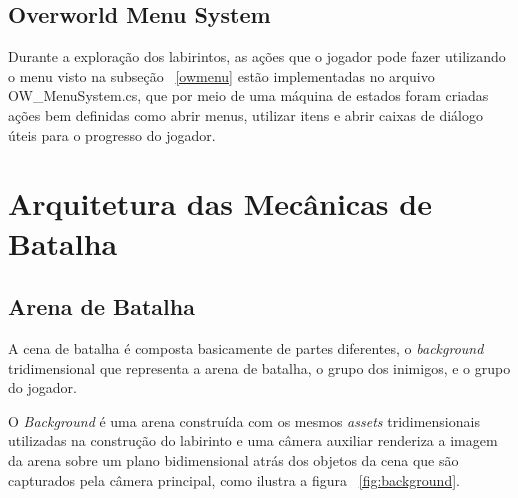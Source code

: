 \subsection{Overworld Menu System}

	Durante a exploração dos labirintos, as ações que o jogador pode fazer utilizando o menu visto na subseção ~\ref{owmenu} estão implementadas no arquivo OW\_MenuSystem.cs, que por meio de uma máquina de estados foram criadas ações bem definidas como abrir menus, utilizar itens e abrir caixas de diálogo úteis para o progresso do jogador.

\section{Arquitetura das Mecânicas de Batalha}

\subsection{Arena de Batalha}

	A cena de batalha é composta basicamente de partes diferentes, o \emph{background} tridimensional que representa a arena de batalha, o grupo dos inimigos, e o grupo do jogador.
	
	O \emph{Background} é uma arena construída com os mesmos \emph{assets} tridimensionais utilizadas na construção do labirinto e uma câmera auxiliar renderiza a imagem da arena sobre um plano bidimensional atrás dos objetos da cena que são capturados pela câmera principal, como ilustra a figura ~\ref{fig:background}.
	
